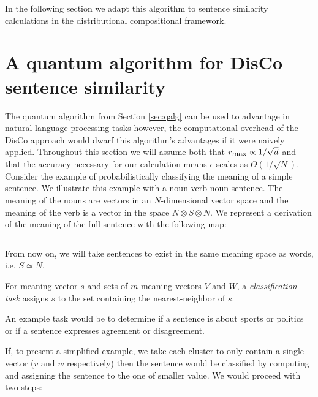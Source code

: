  In the following section we adapt this algorithm to sentence similarity calculations in the distributional compositional framework.

\section{A quantum algorithm for DisCo sentence similarity}
\label{sec:discoQalg}

The quantum algorithm from Section \ref{sec:qalg} can be used to advantage in natural language processing tasks however, the computational overhead of the DisCo approach would dwarf this algorithm's advantages if it were naively applied.  
Throughout this section we will assume both that $r_{\small\mbox{max}}\propto 1/\sqrt{d}$ and that the accuracy necessary for our calculation means $\epsilon$ scales as $\Theta(1/\sqrt{N})$. Consider the example of probabilistically classifying the meaning of a  simple sentence. We illustrate this example with a noun-verb-noun sentence. The meaning of the nouns are vectors in an $N$-dimensional vector space and the meaning of the verb is a vector in the space $N\otimes S \otimes N$. We represent a derivation of the meaning of the full sentence with the following map:

\begin{equation}
\label{eqn:phi}

\end{equation}

From now on, we will take sentences to exist in the same meaning space as words, i.e. $S\simeq N$.

\begin{defn}
For meaning vector $s$ and sets of $m$ meaning vectors $V$ and $W$, a \emph{classification task} assigns $s$ to the set containing the nearest-neighbor of $s$.
\end{defn}

An example task would be to determine if a sentence is about sports or politics or if a sentence expresses agreement or disagreement. 

If, to present a simplified example, we take each cluster to only contain a single vector ($v$ and $w$ respectively) then the sentence would be classified by computing 
\begin{equation}
\label{eq:exampleCalcs}

\end{equation}
and assigning the sentence to the one of smaller value.  We would proceed with two steps:

